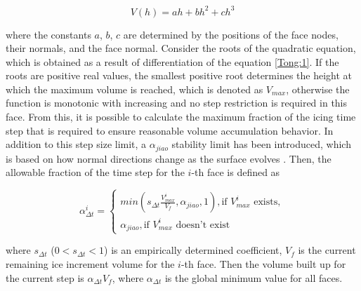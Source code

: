 \documentclass[
11pt,%
tightenlines,%
twoside,%
onecolumn,%
nofloats,%
nobibnotes,%
nofootinbib,%
superscriptaddress,%
noshowpacs,%
centertags]%
{revtex4}
\begin{document}
\begin{equation}\label{Tong:1}
V(h)=ah+bh^2+ch^3
\end{equation}

where the constants $a$, $b$, $c$ are determined by the positions of the face nodes, their normals, and the face normal.
Consider the roots of the quadratic equation, which is obtained as a result of differentiation of the equation \ref{Tong:1}.
If the roots are positive real values, the smallest positive root determines the height at which the maximum volume is reached, which is denoted as $V_{max}$, otherwise the function is monotonic with increasing and no step restriction is required in this face.
From this, it is possible to calculate the maximum fraction of the icing time step that is required to ensure reasonable volume accumulation behavior.
In addition to this step size limit, a $\alpha_{jiao}$ stability limit has been introduced, which is based on how normal directions change as the surface evolves \cite{Jiao}.
Then, the allowable fraction of the time step for the $i$-th face is defined as

\begin{equation}\label{Tong:2}
\alpha_{\Delta t}^i=
\begin{cases}
min(s_{\Delta t}\frac{V_{max}^i}{V_f},\alpha_{jiao},1), \text{if $V_{max}^i$ exists}, \\
\alpha_{jiao}, \text{if $V_{max}^i$ doesn't exist}
\end{cases}
\end{equation}

where $s_{\Delta t}$ ($0 < s_{\Delta t} < 1$) is an empirically determined coefficient, $V_f$ is the current remaining ice increment volume for the $i$-th face.
Then the volume built up for the current step is $\alpha_{\Delta t} V_f$, where $\alpha_{\Delta t}$ is the global minimum value for all faces.
\end{document}
